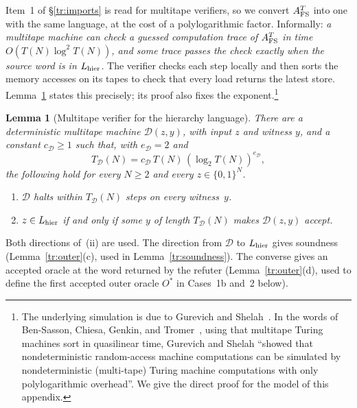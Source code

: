 \documentclass[11pt,letterpaper]{article}
\newtheorem{lemma}[theorem]{Lemma}
\theoremstyle{definition}
\theoremstyle{remark}
\begin{document}
Item~1 of \S\ref{tr:imports} is read for multitape verifiers, so we
convert $A^T_{\rm FS}$ into one with the same language, at the cost of a
polylogarithmic factor. Informally: \emph{a multitape machine can check
a guessed computation trace of $A^T_{\rm FS}$ in time
$O(T(N)\log^2T(N))$, and some trace passes the check exactly when the
source word is in $L_{\rm hier}$.} The verifier checks each step
locally and then sorts the memory accesses on its tapes to check that
every load returns the latest store. Lemma~\ref{tr:hier-verifier}
states this precisely; its proof also fixes the exponent.\footnote{The
underlying simulation is due to Gurevich and Shelah~\cite{GS89}. In the
words of Ben-Sasson, Chiesa, Genkin, and
Tromer~\cite[Section~2.1]{BSCGT13}, using that multitape Turing machines
sort in quasilinear time, Gurevich and Shelah ``showed that
nondeterministic random-access machine computations can be simulated
by nondeterministic (multi-tape) Turing machine computations with only
polylogarithmic overhead''. We give the direct proof for the model of
this appendix.}

\begin{lemma}[Multitape verifier for the hierarchy language]
\label{tr:hier-verifier}
There are a deterministic multitape machine $\mathcal D(z,y)$, with
input $z$ and witness $y$, and a constant $c_{\mathcal D}\ge1$ such
that, with $e_{\mathcal D}=2$ and
\[
 T_{\mathcal D}(N)=c_{\mathcal D}\,T(N)\,(\log_2T(N))^{e_{\mathcal D}},
\]
the following hold for every $N\ge2$ and every $z\in\{0,1\}^N$.
\begin{enumerate}[label=(\roman*)]
\item $\mathcal D$ halts within $T_{\mathcal D}(N)$ steps on every
witness~$y$.
\item $z\in L_{\rm hier}$ if and only if some $y$ of length
$T_{\mathcal D}(N)$ makes $\mathcal D(z,y)$ accept.
\end{enumerate}
\end{lemma}

Both directions of~(ii) are used. The direction from $\mathcal D$ to
$L_{\rm hier}$ gives soundness (Lemma~\ref{tr:outer}(c), used in
Lemma~\ref{tr:soundness}). The converse gives an accepted oracle at the
word returned by the refuter (Lemma~\ref{tr:outer}(d), used to define
the first accepted outer oracle $O^*$ in Cases~1b and~2 below).
\end{document}
